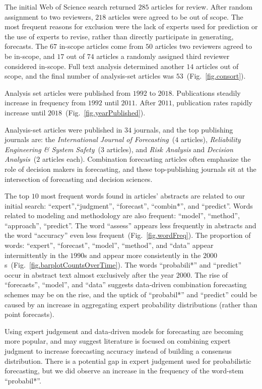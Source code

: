 \documentclass[preprint,authoryear,nonatbib]{elsarticle}
\begin{document}
The initial Web of Science search returned $285$ articles for review.
After random assignment to two reviewers, $218$ articles were agreed  to be out of scope. 
The most frequent reasons for exclusion were the lack of experts used for prediction or the use of experts to revise, rather than directly participate in generating, forecasts.
The $67$ in-scope articles come from $50$ articles two reviewers agreed to be in-scope, and $17$ out of $74$ articles a randomly assigned third reviewer considered in-scope.
Full text analysis determined another $14$ articles out of scope, and the final number of analysis-set articles was $53$~(Fig.~\ref{fig.consort}).

Analysis set articles were published from $1992$ to $2018$.
Publications steadily increase in frequency from $1992$ until $2011$.
After $2011$, publication rates rapidly increase until $2018$~(Fig.~\ref{fig.yearPublished}).

Analysis-set articles were published in $34$ journals, and the top publishing journals are: the \textit{International Journal of Forecasting}~($4$ articles), \textit{Reliability Engineering \& System Safety}~($3$ articles), and \textit{Risk Analysis} and \textit{Decision Analysis}~($2$ articles each).
Combination forecasting articles often emphasize the role of decision makers in forecasting, and
these top-publishing journals sit at the intersection of forecasting and decision sciences.

The top $10$ most frequent words found in articles' abstracts are related to our initial search: ``expert'',``judgment'', ``forecast'', ``combin*'', and ``predict''.
Words related to modeling and methodology are also frequent: ``model'', ``method'', ``approach'', ``predict''.
The word ``assess'' appears less frequently in abstracts and the word ``accuracy'' even less frequent~(Fig.~\ref{fig.wordFreq}).
%
The proportion of words: ``expert'', ``forecast'', ``model'', ``method'', and ``data'' appear intermittently in the $1990$s and appear more consistently in the $2000$s~(Fig.~\ref{fig.barplotCountsOverTime}).
The words ``probabili*'' and ``predict'' occur in abstract text almost exclusively after the year $2000$.
The rise of ``forecasts'', ``model'', and ``data'' suggests data-driven combination forecasting schemes may be on the rise, and the uptick of ``probabil*'' and ``predict'' could be caused by an increase in aggregating expert probability distributions (rather than point forecasts).

Using expert judgement and data-driven models for forecasting are becoming more popular, and may suggest literature is focused on combining expert judgment to increase forecasting accuracy instead of building a consensus distribution.
There is a potential gap in expert judgement used for probabilistic forecasting, but we did observe an increase in the frequency of the word-stem ``probabil*''.
\end{document}
